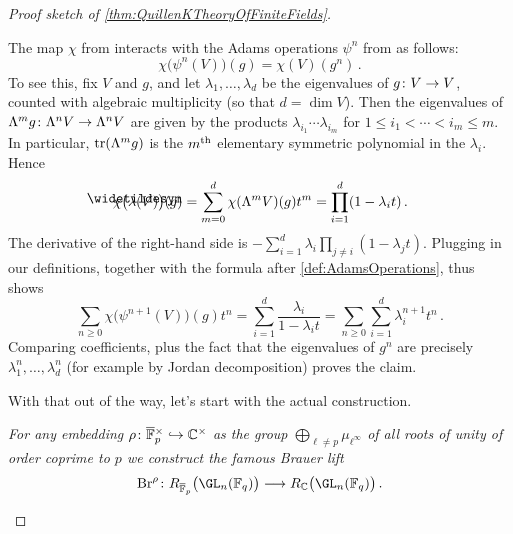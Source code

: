 \begin{proof}[Proof sketch of \cref{thm:QuillenKTheoryOfFiniteFields}]
\begin{alphanumerate}
		\item The map $\chi$ from  interacts with the Adams operations $\psi^n$ from  as follows:
		\begin{equation*}
			\chi\big(\psi^n(V)\big)(g)=\chi(V)(g^n)\,.
		\end{equation*}
		To see this, fix $V$ and $g$, and let $\lambda_1,\dotsc,\lambda_d$ be the eigenvalues of $g\colon V\morphism V$, counted with algebraic multiplicity (so that $d=\dim V$). Then the eigenvalues of $\Lambda^mg\colon \Lambda^nV\morphism\Lambda^nV$ are given by the products $\lambda_{i_1}\dotsm\lambda_{i_m}$ for $1\leq i_1< \dotsb< i_m\leq m$. In particular, $\operatorname{tr}(\Lambda^mg)$ is the $m^{\text{th}}$ elementary symmetric polynomial in the $\lambda_i$. Hence
		\begin{equation*}
			\chi\big(\snake{\lambda}(V)\big)(g)=\sum_{m=0}^d\chi(\Lambda^mV)(g)t^m=\prod_{i=1}^d(1-\lambda_it)\,.
		\end{equation*}
		The derivative of the right-hand side is $-\sum_{i=1}^d\lambda_i\prod_{j\neq i}(1-\lambda_jt)$. Plugging in our definitions, together with the formula after \cref{def:AdamsOperations}, thus shows
		\begin{equation*}
			\sum_{n\geq 0}\chi\big(\psi^{n+1}(V)\big)(g)t^n=\sum_{i=1}^d\frac{\lambda_i}{1-\lambda_it}=\sum_{n\geq 0}\sum_{i=1}^d\lambda_i^{n+1}t^n\,.
		\end{equation*}
		Comparing coefficients, plus the fact that the eigenvalues of $g^n$ are precisely $\lambda_1^n,\dotsc,\lambda_d^n$ (for example by Jordan decomposition) proves the claim.
	\end{alphanumerate}
	With that out of the way, let's start with the actual construction.
	\begin{alphanumerate}
		\item[\itememph{1}] \itshape For any embedding $\rho\colon \ov{\IF}_p^\times\monomorphism \IC^\times$ as the group $\bigoplus_{\ell\neq p}\mu_{\ell^\infty}$ of all roots of unity of order coprime to $p$ we construct the famous \emph{Brauer lift}
		\begin{equation*}
			\operatorname{Br}^\rho\colon R_{\ov{\IF}_p}\big(\GL_n(\IF_q)\big)\morphism R_\IC\big(\GL_n(\IF_q)\big)\,.
		\end{equation*}
	\end{alphanumerate}
	

\end{proof}
